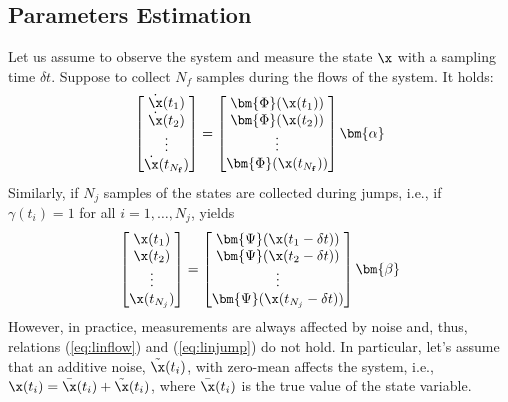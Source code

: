\subsection{Parameters Estimation}
Let us assume to observe the system and measure the state $\x$ with a sampling time $\delta t$. Suppose to collect $N_f$ samples during the flows of the system. %
It holds:
\begin{equation}\label{eq:linflow}
	\begin{bmatrix}\dot{\x}(t_1)\\\dot{\x}(t_2)\\\vdots\\\dot{\x}(t_{N_\mathbf{f}})\end{bmatrix}=
	\begin{bmatrix}\bm{\Phi}(\x(t_1))\\\bm{\Phi}(\x(t_2))\\\vdots\\\bm{\Phi}(\x(t_{N_\mathbf{f}}))\end{bmatrix}\bm{\alpha}
\end{equation}
Similarly, if $N_j$ samples of the states are collected during jumps, i.e., if $\gamma(t_i)=1$ for all $i = 1,\dots,N_j$, yields
\begin{equation}\label{eq:linjump}
	\begin{bmatrix}{\x}(t_1)\\\x(t_2)\\\vdots\\{\x}(t_{N_j})\end{bmatrix}=
	\begin{bmatrix}\bm{\Psi}(\x(t_1-\delta t))\\\bm{\Psi}(\x(t_2-\delta t))\\\vdots\\\bm{\Psi}(\x(t_{N_j}-\delta t))\end{bmatrix}\bm{\beta}
\end{equation}
However, in practice, measurements are always affected by noise and, thus, relations (\ref{eq:linflow}) and (\ref{eq:linjump}) do not hold.
In particular, let's assume that an additive noise, $\tilde{\x}(t_i)$, with zero-mean affects the system, i.e., $\x(t_i)=\bar{\x}(t_i)+\tilde{\x}(t_i)$, where $\bar{\x}(t_i)$ is the true value of the state variable.


